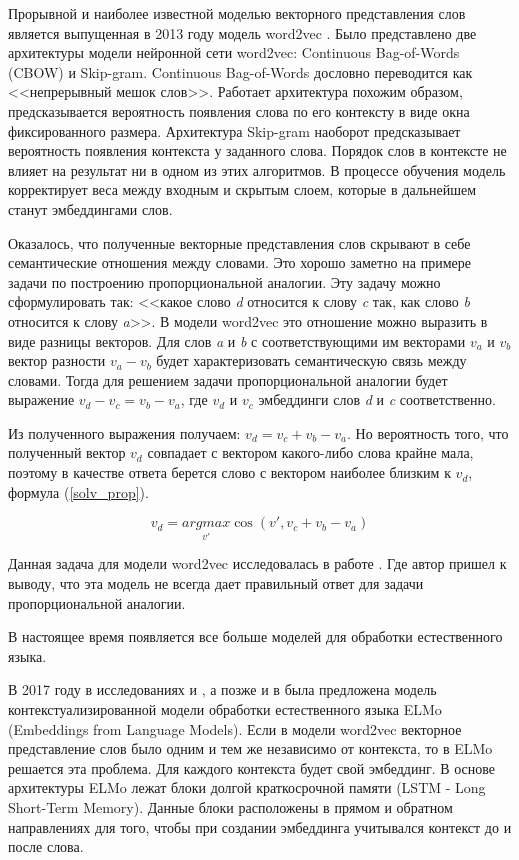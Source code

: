 \documentclass[a4paper,14pt]{article}
\begin{document}
Прорывной и наиболее известной моделью векторного представления слов является выпущенная в 2013 году модель word2vec \cite{w2v}.
Было представлено две архитектуры модели нейронной сети word2vec: Continuous Bag-of-Words
(CBOW) и Skip-gram. 
Continuous Bag-of-Words дословно переводится как <<непрерывный мешок слов>>.
Работает архитектура похожим образом, предсказывается вероятность появления слова по его контексту в виде окна фиксированного размера.
Архитектура Skip-gram наоборот предсказывает вероятность появления контекста у заданного слова.
Порядок слов в контексте не влияет на результат ни в одном из этих алгоритмов.
В процессе обучения модель корректирует веса между входным и скрытым слоем, которые в дальнейшем станут эмбеддингами слов.

Оказалось, что полученные векторные представления слов скрывают в себе семантические отношения между словами.
Это хорошо заметно на примере задачи по построению пропорциональной аналогии.
Эту задачу можно сформулировать так: <<какое слово \textit{d} относится к слову \textit{c} так, как слово \textit{b} относится к слову \textit{a}>>.
В модели word2vec это отношение можно выразить в виде разницы векторов.
Для слов \textit{a} и \textit{b} с соответствующими им векторами $v_a$ и $v_b$ вектор разности $v_a - v_b$ будет характеризовать семантическую связь между словами.
Тогда для решением задачи пропорциональной аналогии будет выражение $v_d - v_c = v_b - v_a$, где $v_d$ и $v_c$ эмбеддинги слов \textit{d} и \textit{c} соответственно.

Из полученного выражения получаем: $v_d = v_c + v_b - v_a$.
Но вероятность того, что полученный вектор $v_d$ совпадает с вектором какого-либо слова крайне мала, поэтому в качестве ответа берется слово с вектором наиболее близким к $v_d$, формула (\ref{solv_prop}).

\begin{equation}
	v_d = \underset{v'}{argmax} \cos (v', v_c + v_b - v_a)
	\label{solv_prop}
\end{equation}

Данная задача для модели word2vec исследовалась в работе \cite{w2vkor}. Где автор пришел к выводу, что эта модель не всегда дает правильный ответ для задачи пропорциональной аналогии.

В настоящее время появляется все больше моделей для обработки естественного языка.

В 2017 году в исследованиях \cite{elmo1} и \cite{elmo2}, а позже и в \cite{elmo3} была предложена модель контекстуализированной модели обработки естественного языка ELMo (Embeddings from Language Models).
Если в модели word2vec векторное представление слов было одним и тем же независимо от контекста, то в ELMo решается эта проблема.
Для каждого контекста будет свой эмбеддинг.
В основе архитектуры ELMo лежат блоки долгой краткосрочной памяти (LSTM - Long Short-Term Memory).
Данные блоки расположены в прямом и обратном направлениях для того, чтобы при создании эмбеддинга учитывался контекст до и после слова.
\end{document}
